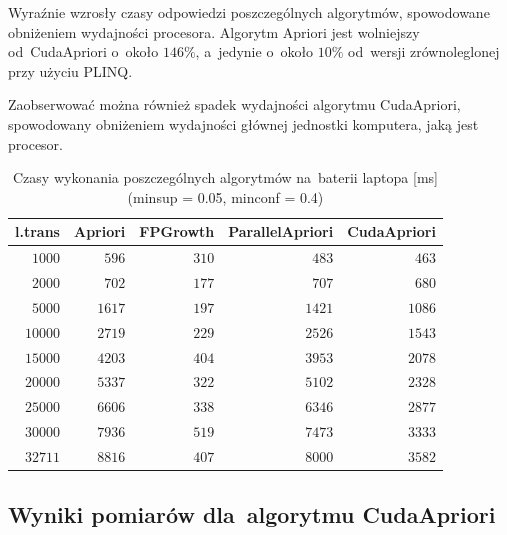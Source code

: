 Wyraźnie wzrosły czasy odpowiedzi poszczególnych algorytmów, spowodowane obniżeniem wydajności procesora. Algorytm Apriori jest wolniejszy od~CudaApriori o~około $146\%$, a~jedynie o~około $10\%$ od~wersji zrównoleglonej przy użyciu PLINQ.

Zaobserwować można również spadek wydajności algorytmu CudaApriori, spowodowany obniżeniem wydajności głównej jednostki komputera, jaką jest procesor.

\begin{table}
	\centering
	\begin{tabular}{r|r|r|r|r}
	\textbf{l.trans} & \textbf{Apriori} & \textbf{FPGrowth} & \textbf{ParallelApriori} & \textbf{CudaApriori}  \\ \hline
	$1000$ & $596$ & $310$ & $483$ & $463$ \\
	$2000$ & $702$ & $177$ & $707$ & $680$ \\
	$5000$ & $1617$ & $197$ & $1421$ & $1086$ \\
	$10000$ & $2719$ & $229$ & $2526$ & $1543$ \\
	$15000$ & $4203$ & $404$ & $3953$ & $2078$ \\
	$20000$ & $5337$ & $322$ & $5102$ & $2328$ \\
	$25000$ & $6606$ & $338$ & $6346$ & $2877$ \\
	$30000$ & $7936$ & $519$ & $7473$ & $3333$ \\
	$32711$ & $8816$ & $407$ & $8000$ & $3582$ \\
	\end{tabular}
	\caption{Czasy wykonania poszczególnych algorytmów na~baterii laptopa [ms] (minsup = 0.05, minconf = 0.4)\label{tab:005_04_bat}}
\end{table}


\subsection{Wyniki pomiarów dla~algorytmu CudaApriori}


